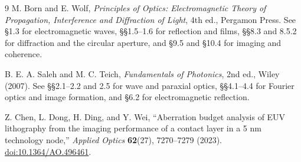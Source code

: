 \documentclass[11pt,a4paper]{article}
\numberwithin{equation}{section}
\begin{document}


\newpage
\begin{thebibliography}{9}
M. Born and E. Wolf, \emph{Principles of Optics: Electromagnetic Theory
of Propagation, Interference and Diffraction of Light}, 4th ed.,
Pergamon Press. See \S1.3 for electromagnetic waves, \S\S1.5--1.6 for
reflection and films, \S\S8.3 and 8.5.2 for diffraction and the circular
aperture, and \S9.5 and \S10.4 for imaging and coherence.

B. E. A. Saleh and M. C. Teich, \emph{Fundamentals of Photonics},
2nd ed., Wiley (2007). See \S\S2.1--2.2 and 2.5 for wave and paraxial
optics, \S\S4.1--4.4 for Fourier optics and image formation, and
\S6.2 for electromagnetic reflection.

Z. Chen, L. Dong, H. Ding, and Y. Wei,
``Aberration budget analysis of EUV lithography from the imaging
performance of a contact layer in a 5 nm technology node,''
\emph{Applied Optics} \textbf{62}(27), 7270--7279 (2023).
\href{https://doi.org/10.1364/AO.496461}{doi:10.1364/AO.496461}.
\end{thebibliography}
\end{document}
